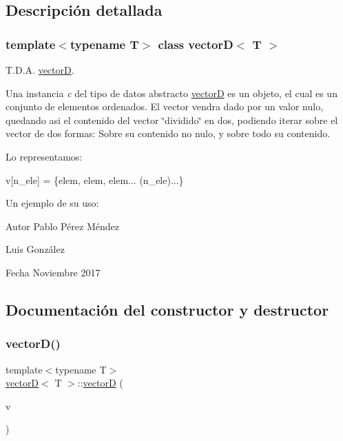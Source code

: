 \subsection{Descripción detallada}
\subsubsection*{template$<$typename T$>$\newline
class vector\+D$<$ T $>$}

T.\+D.\+A. \hyperlink{classvectorD}{vectorD}. 

Una instancia {\itshape c} del tipo de datos abstracto {\ttfamily \hyperlink{classvectorD}{vectorD}} es un objeto, el cual es un conjunto de elementos ordenados. El vector vendra dado por un valor nulo, quedando asi el contenido del vector \char`\"{}dividido\char`\"{} en dos, podiendo iterar sobre el vector de dos formas\+: Sobre su contenido no nulo, y sobre todo su contenido.

Lo representamos\+:

v\mbox{[}n\+\_\+ele\mbox{]} = \{elem, elem, elem... (n\+\_\+ele)...\}

Un ejemplo de su uso\+: 
\begin{DoxyCodeInclude}
\end{DoxyCodeInclude}
 
\begin{DoxyCodeInclude}
\end{DoxyCodeInclude}


\begin{DoxyAuthor}{Autor}
Pablo Pérez Méndez 

Luis González 
\end{DoxyAuthor}
\begin{DoxyDate}{Fecha}
Noviembre 2017 
\end{DoxyDate}


\subsection{Documentación del constructor y destructor}
\mbox{\label{classvectorD_ae2ae2997890f32424eb64a23c1924cf8}} 
\subsubsection{\texorpdfstring{vector\+D()}{vectorD()}\hspace{0.1cm}{\footnotesize\ttfamily [1/2]}}
{\footnotesize\ttfamily template$<$typename T$>$ \\
\hyperlink{classvectorD}{vectorD}$<$ T $>$\+::\hyperlink{classvectorD}{vectorD} (\begin{DoxyParamCaption}\item[{const \hyperlink{classvectorD}{vectorD}$<$ T $>$ \&}]{v }\end{DoxyParamCaption})}



